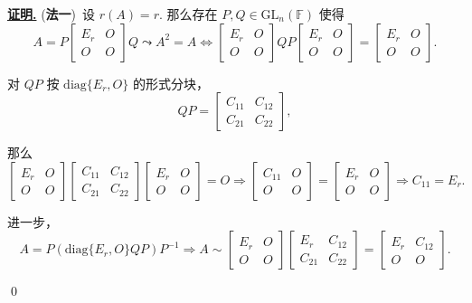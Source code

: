 \documentclass[10pt,openany]{article}
\theoremstyle{thmstyle} %
\theoremstyle{defstyle} %
\theoremstyle{prostyle} %
\theoremstyle{exastyle}
\theoremstyle{remstyle}
\renewenvironment{proof}[1][证明]{\par\underline{\textbf{#1.}} \;\fangsong}{\qed\par}
\newcommand{\gfn}{\text{GL}_n(\mathbb{F})}
\newcommand{\diag}{\mathrm{diag}}
\begin{document}
\begin{proof}
	(\textbf{法一})\ 设 \( r(A)=r \). 那么存在 \( P,Q \in \gfn \) 使得
	\[ A=P\begin{bmatrix}
		E_r & O \\
		O & O
	\end{bmatrix}Q \leadsto A^2=A \Leftrightarrow \begin{bmatrix}
		E_r & O \\
		O & O
	\end{bmatrix}QP\begin{bmatrix}
		E_r & O \\
		O & O
	\end{bmatrix}=\begin{bmatrix}
	E_r & O \\
	O & O
	\end{bmatrix}.\]
	
	对 \( QP \) 按 \( \diag\{E_r,O\} \) 的形式分块，
	\[ QP=\begin{bmatrix}
		C_{11} & C_{12} \\
		C_{21} & C_{22}
	\end{bmatrix}, \]
	
	那么
	\[ \begin{bmatrix}
		E_r & O \\
		O & O
	\end{bmatrix}\begin{bmatrix}
		C_{11} & C_{12} \\
		C_{21} & C_{22}
	\end{bmatrix}\begin{bmatrix}
		E_r & O \\
		O & O
	\end{bmatrix}=O \Rightarrow \begin{bmatrix}
	C_{11} & O \\
	O & O
	\end{bmatrix}=\begin{bmatrix}
		E_r & O \\
		O & O
	\end{bmatrix} \Rightarrow C_{11}=E_r. \]
	
	进一步，
	\[ A=P(\diag\{E_r,O\}QP)P^{-1} \Rightarrow A \sim \begin{bmatrix}
		E_r & O \\
		O & O
	\end{bmatrix}\begin{bmatrix}
	E_r & C_{12} \\
	C_{21} & C_{22}
	\end{bmatrix}=\begin{bmatrix}
	E_r & C_{12} \\
	O & O
     \end{bmatrix}. \]


\end{proof}
\end{document}
